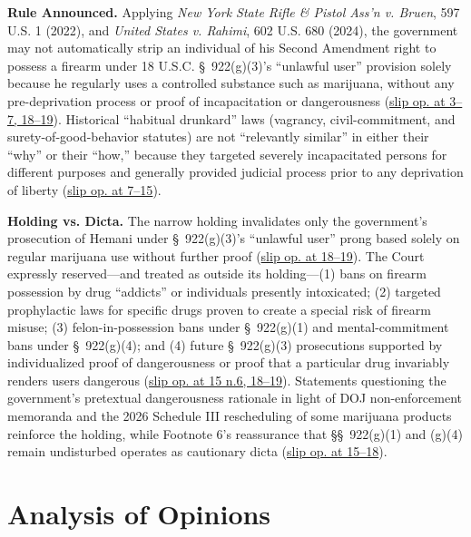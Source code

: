 \documentclass[12pt]{article}
\begin{document}
\textbf{Rule Announced.} Applying \textit{New York State Rifle \& Pistol Ass'n v. Bruen}, 597 U.S. 1 (2022), and \textit{United States v. Rahimi}, 602 U.S. 680 (2024), the government may not automatically strip an individual of his Second Amendment right to possess a firearm under 18 U.S.C. \S~922(g)(3)'s ``unlawful user'' provision solely because he regularly uses a controlled substance such as marijuana, without any pre-deprivation process or proof of incapacitation or dangerousness (\href{https://supreme.justia.com/cases/federal/us/608/24-1234/}{slip op. at 3--7, 18--19}). Historical ``habitual drunkard'' laws (vagrancy, civil-commitment, and surety-of-good-behavior statutes) are not ``relevantly similar'' in either their ``why'' or their ``how,'' because they targeted severely incapacitated persons for different purposes and generally provided judicial process prior to any deprivation of liberty (\href{https://supreme.justia.com/cases/federal/us/608/24-1234/}{slip op. at 7--15}).

\textbf{Holding vs. Dicta.} The narrow holding invalidates only the government's prosecution of Hemani under \S~922(g)(3)'s ``unlawful user'' prong based solely on regular marijuana use without further proof (\href{https://supreme.justia.com/cases/federal/us/608/24-1234/}{slip op. at 18--19}). The Court expressly reserved---and treated as outside its holding---(1) bans on firearm possession by drug ``addicts'' or individuals presently intoxicated; (2) targeted prophylactic laws for specific drugs proven to create a special risk of firearm misuse; (3) felon-in-possession bans under \S~922(g)(1) and mental-commitment bans under \S~922(g)(4); and (4) future \S~922(g)(3) prosecutions supported by individualized proof of dangerousness or proof that a particular drug invariably renders users dangerous (\href{https://supreme.justia.com/cases/federal/us/608/24-1234/}{slip op. at 15 n.6, 18--19}). Statements questioning the government's pretextual dangerousness rationale in light of DOJ non-enforcement memoranda and the 2026 Schedule III rescheduling of some marijuana products reinforce the holding, while Footnote 6's reassurance that \S\S~922(g)(1) and (g)(4) remain undisturbed operates as cautionary dicta (\href{https://supreme.justia.com/cases/federal/us/608/24-1234/}{slip op. at 15--18}).

\section{Analysis of Opinions}
\end{document}
